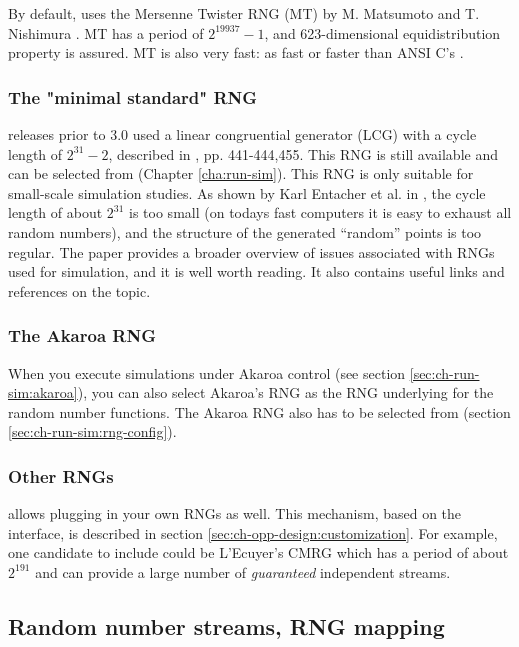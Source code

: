 By default, {\opp} uses the Mersenne Twister RNG (MT) by M. Matsumoto and
T. Nishimura \cite{Matsumoto98}. MT has a period of $2^{19937}-1$,
and 623-dimensional equidistribution property is assured. MT is
also very fast: as fast or faster than ANSI C's .

\subsubsection{The "minimal standard" RNG}

{\opp} releases prior to 3.0 used a linear congruential generator
(LCG) with a cycle length of $2^{31}-2$, described in
\cite{Jain91}, pp. 441-444,455. This RNG is still available
and can be selected from  (Chapter \ref{cha:run-sim}).
This RNG is only suitable for small-scale simulation studies.
As shown by Karl Entacher et al. in \cite{Entacher02},
the cycle length of about $2^{31}$ is too small (on todays
fast computers it is easy to exhaust all random numbers), and
the structure of the generated ``random'' points is too regular.
The \cite{Hellekalek98} paper provides a broader overview of issues
associated with RNGs used for simulation, and it is well worth reading.
It also contains useful links and references on the topic.

\subsubsection{The Akaroa RNG}

When you execute simulations under Akaroa control (see section
\ref{sec:ch-run-sim:akaroa}), you can also select Akaroa's
RNG as the RNG underlying for the {\opp} random number functions.
The Akaroa RNG also has to be selected from 
(section \ref{sec:ch-run-sim:rng-config}).

\subsubsection{Other RNGs}

{\opp} allows plugging in your own RNGs as well. This mechanism,
based on the  interface, is described in section
\ref{sec:ch-opp-design:customization}.
For example, one candidate to include could be L'Ecuyer's CMRG \cite{LEcuyer02}
which has a period of about $2^{191}$ and can provide a large
number of \textit{guaranteed} independent streams.


\subsection{Random number streams, RNG mapping}

